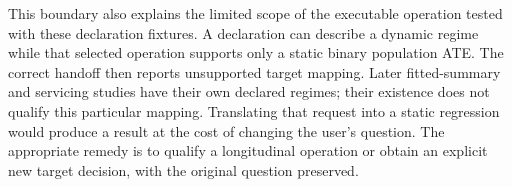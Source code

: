 This boundary also explains the limited scope of the executable operation
tested with these declaration fixtures. A declaration can describe a dynamic
regime while that selected operation supports only a static binary population
ATE. The correct handoff then reports unsupported target mapping. Later
fitted-summary and servicing studies have their own declared regimes; their
existence does not qualify this particular mapping. Translating that request into a
static regression would produce a result at the cost of changing the user's
question. The appropriate remedy is to qualify a longitudinal operation or
obtain an explicit new target decision, with the original question preserved.
